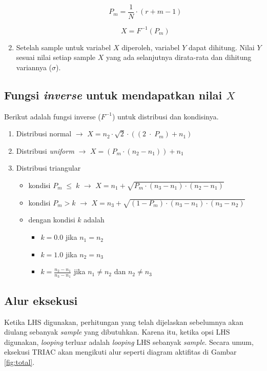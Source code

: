 \documentclass[a4paper,11pt]{report}
\begin{document}
\begin{enumerate}
\begin{itemize}
\begin{equation}
P_m=\frac{1}{N} \cdot \left(r+m-1\right)
\label{eq:pm}
\end{equation}

\begin{equation}
X=F^{-1}\left(P_m\right)
\label{eq:X}
\end{equation}

    \end{itemize}
    \item Setelah sample untuk variabel $X$ diperoleh, variabel $Y$ dapat dihitung. Nilai $Y$ sesuai nilai setiap sample $X$ yang ada selanjutnya dirata-rata dan dihitung variannya ($\sigma$).
\end{enumerate}

\subsection{Fungsi \textit{inverse} untuk mendapatkan nilai $X$}
\label{sec:finverse}
Berikut adalah fungsi inverse ($F^{-1}$) untuk distribusi dan kondisinya.
\begin{enumerate}
  \item Distribusi normal $\rightarrow$ $X=n_2 \cdot \sqrt{2} \cdot ((2\;\cdot\;P_m)+n_1)$
  \item Distribusi \textit{uniform} $\rightarrow$ $X=(P_m \cdot (n_2-n_1))+n_1$
  \item Distribusi triangular
  \begin{itemize}
    \item kondisi $P_m\;\leq\;k$ $\rightarrow$ $X=n_1+\sqrt{P_m\cdot(n_3-n_1)\cdot(n_2-n_1)}$
    \item kondisi $P_m>k$ $\rightarrow$ $X=n_3+\sqrt{(1-P_m)\cdot(n_3-n_1)\cdot(n_3-n_2)}$
    \item dengan kondisi $k$ adalah
    \begin{itemize}
      \item $k=0.0$ jika $n_1=n_2$
      \item $k=1.0$ jika $n_2=n_3$
      \item $k=\frac{n_2-n_1}{n_3-n_1}$ jika $n_1 \neq n_2$ dan $n_2 \neq n_3$
    \end{itemize}
  \end{itemize}
\end{enumerate}

\subsection{Alur eksekusi}
Ketika LHS digunakan, perhitungan yang telah dijelaskan sebelumnya akan diulang sebanyak \textit{sample} yang dibutuhkan. Karena itu, ketika opsi LHS digunakan, \textit{looping} terluar adalah \textit{looping} LHS sebanyak \textit{sample}. Secara umum, eksekusi TRIAC akan mengikuti alur seperti diagram aktifitas di Gambar \ref{fig:total}.
\end{document}
